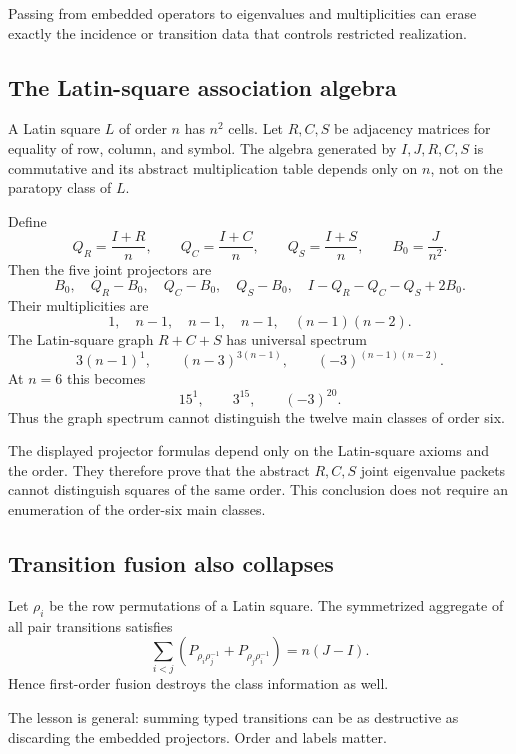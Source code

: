 \begin{principle}
Passing from embedded operators to eigenvalues and multiplicities can erase exactly the incidence or transition data that controls restricted realization.
\end{principle}

\subsection{The Latin-square association algebra}
A Latin square $L$ of order $n$ has $n^2$ cells.  Let $R,C,S$ be adjacency matrices for equality of row, column, and symbol.  The algebra generated by $I,J,R,C,S$ is commutative and its abstract multiplication table depends only on $n$, not on the paratopy class of $L$.

Define
\[
Q_R=\frac{I+R}{n},
\qquad
Q_C=\frac{I+C}{n},
\qquad
Q_S=\frac{I+S}{n},
\qquad
B_0=\frac{J}{n^2}.
\]
Then the five joint projectors are
\[
B_0,
\quad Q_R-B_0,
\quad Q_C-B_0,
\quad Q_S-B_0,
\quad I-Q_R-Q_C-Q_S+2B_0.
\]
Their multiplicities are
\[
1,
\quad n-1,
\quad n-1,
\quad n-1,
\quad (n-1)(n-2).
\]
The Latin-square graph $R+C+S$ has universal spectrum
\[
3(n-1)^1,
\qquad
(n-3)^{3(n-1)},
\qquad
(-3)^{(n-1)(n-2)}.
\]
At $n=6$ this becomes
\[
15^1,\qquad3^{15},\qquad(-3)^{20}.
\]
Thus the graph spectrum cannot distinguish the twelve main classes of order six.

\begin{provedbox}
The displayed projector formulas depend only on the Latin-square axioms and the order.  They therefore prove that the abstract $R,C,S$ joint eigenvalue packets cannot distinguish squares of the same order.  This conclusion does not require an enumeration of the order-six main classes.
\end{provedbox}

\subsection{Transition fusion also collapses}
Let $\rho_i$ be the row permutations of a Latin square.  The symmetrized aggregate of all pair transitions satisfies
\begin{equation}\label{g:eq:transition-fusion}
\sum_{i<j}
\left(
P_{\rho_i\rho_j^{-1}}
+
P_{\rho_j\rho_i^{-1}}
\right)
=n(J-I).
\end{equation}
Hence first-order fusion destroys the class information as well.

The lesson is general: summing typed transitions can be as destructive as discarding the embedded projectors.  Order and labels matter.

